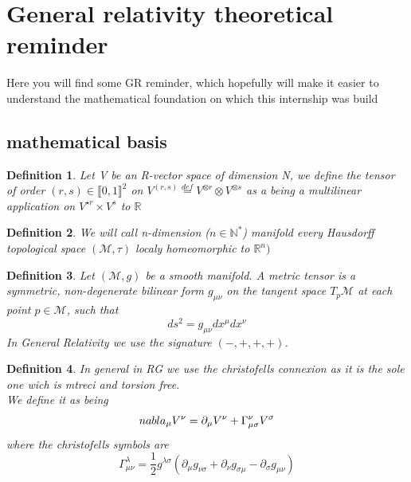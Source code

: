 \documentclass{article}
\newtheorem{definition}{Definition}
\begin{document}
\section{General relativity theoretical reminder}
Here you will find some GR reminder, which hopefully will make it easier to understand the mathematical foundation on which this internship was build
\subsection{mathematical basis}
\begin{definition}
Let V be an R-vector space of dimension N, we define the tensor of order $(r,s) \in  \llbracket 0 ,1 \rrbracket^2$ on $V^{(r,s)} \overset{def}{=} V^{\otimes r} \otimes V^{\otimes s}$
as a being a multilinear application on $ V^{\star r} \times V^{ s}$ to $\mathbb{R}$
 \end{definition}

\begin{definition}
    We will call n-dimension ($n \in \mathbb{N}^*$) manifold every Hausdorff topological space $(\mathcal{M},\tau )$ localy homeomorphic to $\mathbb{R}^n)$
\end{definition}
\begin{definition}
    Let $(\mathcal{M}, g)$ be a smooth manifold. A metric tensor is a symmetric, 
    non-degenerate bilinear form $g_{\mu\nu}$ on the tangent space $T_p\mathcal{M}$ 
    at each point $p \in \mathcal{M}$, such that
    \begin{equation*}
        ds^2 = g_{\mu\nu} dx^\mu dx^\nu
    \end{equation*}
    In General Relativity we use the signature $(-,+,+,+)$.
\end{definition}
\begin{definition}
   In general in RG we use the christofells connexion as it is the sole one wich is mtreci and torsion free.\\
   We define it as being
   \begin{equation}
    \\nabla_{\mu}V^{\nu}= \partial_{\mu}V^{\nu}+\Gamma^{\nu}_{\mu \sigma}V^{\sigma}
   \end{equation} 
   where the christofells symbols are
   \begin{equation}
    \Gamma_{\mu \nu}^{\lambda} = \frac{1}{2}g^{\lambda \sigma}(\partial_{\mu}g_{\nu \sigma}+\partial_{\nu}g_{\sigma \mu} - \partial_{\sigma}g_{\mu \nu})
   \end{equation}
\end{definition}
\end{document}
